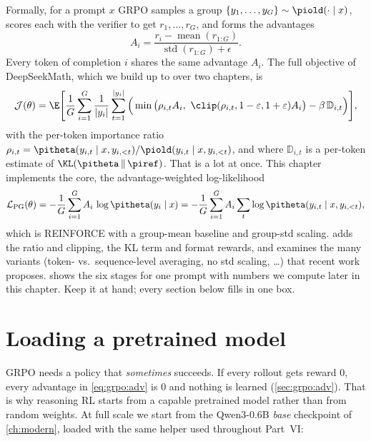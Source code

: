 Formally, for a prompt $x$ GRPO samples a group $\{y_1,\dots,y_G\}\sim\piold(\cdot\mid x)$,
scores each with the verifier to get $r_1,\dots,r_G$, and forms the advantages
\begin{equation}
A_i=\frac{r_i-\operatorname{mean}(r_{1:G})}{\operatorname{std}(r_{1:G})+\epsilon}.
\label{eq:grpo:adv}
\end{equation}
Every token of completion $i$ shares the same advantage $A_i$. The full objective of
DeepSeekMath, which we build up to over two chapters, is
\begin{equation}
\mathcal{J}(\theta)=\E\Bigg[\frac1G\sum_{i=1}^{G}\frac1{|y_i|}\sum_{t=1}^{|y_i|}
\Big(\min\big(\rho_{i,t}A_i,\ \clip(\rho_{i,t},1-\varepsilon,1+\varepsilon)A_i\big)
-\beta\,\mathbb{D}_{i,t}\Big)\Bigg],
\label{eq:grpo:full}
\end{equation}
with the per-token importance ratio
$\rho_{i,t}=\pitheta(y_{i,t}\mid x,y_{i,<t})/\piold(y_{i,t}\mid x,y_{i,<t})$, and where $\mathbb{D}_{i,t}$ is a per-token estimate of $\KL(\pitheta\,\|\,\piref)$. That is a
lot at once. This chapter implements the core, the advantage-weighted log-likelihood
\begin{equation}
\mathcal{L}_{\text{PG}}(\theta)=-\frac1G\sum_{i=1}^G A_i\,\log\pitheta(y_i\mid x)
 =-\frac1G\sum_{i=1}^G A_i\sum_{t}\log\pitheta(y_{i,t}\mid x,y_{i,<t}),
\label{eq:grpo:pg_loss}
\end{equation}
which is REINFORCE with a group-mean baseline and group-std scaling.  adds
the ratio and clipping, the KL term and format rewards, and examines the many variants
(token- vs.\ sequence-level averaging, no std scaling, \dots) that recent work proposes.
 shows the six stages for one prompt with numbers we compute later in
this chapter. Keep it at hand; every section below fills in one box.


\section{Loading a pretrained model}\label{sec:grpo:load}

GRPO needs a policy that \emph{sometimes} succeeds. If every rollout gets reward 0, every
advantage in \cref{eq:grpo:adv} is 0 and nothing is learned (\cref{sec:grpo:adv}). That is
why reasoning RL starts from a capable pretrained model rather than from random weights.
At full scale we start from the Qwen3-0.6B \emph{base} checkpoint of \cref{ch:modern},
loaded with the same helper used throughout Part~VI:

